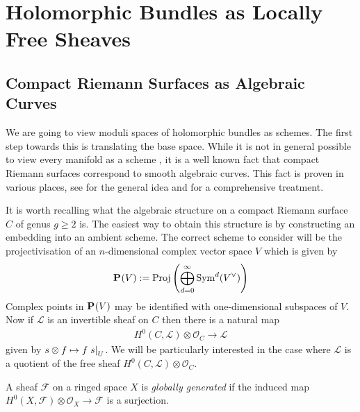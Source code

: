 \documentclass[12pt]{ociamthesis}  %
\begin{document}
\section{Holomorphic Bundles as Locally Free Sheaves}

\missingsection

\subsection{Compact Riemann Surfaces as Algebraic Curves}
\label{sec:surfaces_as_curves}

We are going to view moduli spaces of holomorphic bundles
as schemes. The first step towards this is translating the
base space. While it is not in general possible to view
every manifold as a scheme \missingcitation, it is a well
known fact that compact Riemann surfaces correspond to smooth
algebraic curves.
This fact is proven in various places, see \cite[215]{griffiths1994}
for the general idea and \cite[5-16]{harris2011}
for a comprehensive treatment.

It is worth recalling what the algebraic structure on a compact
Riemann surface $C$ of genus $g\geq 2$ is. The easiest way to obtain
this structure is by constructing an embedding into an ambient
scheme. The correct scheme to consider will be the projectivisation
of an $n$-dimensional complex vector space $V$ which is given
by
\begin{align*}
  \mathbf{P}^{}_{}(V) := \operatorname{Proj}\left({
      \bigoplus_{d=0}^\infty \operatorname{Sym}^d(V^\vee)
  }\right)
\end{align*}
Complex points in $\mathbf{P}^{}_{}(V)$ may be identified
with one-dimensional subspaces of $V$. \missingcitation
Now if $\mathcal L$ is
an invertible sheaf on $C$ then there is a natural map
\begin{align}\label{eq:natural_line_bundle_map}
  H^0(C,\mathcal L)\otimes\mathcal O_C \to \mathcal L
\end{align}
given by $s\otimes f \mapsto f\left.{s}\right\vert_{U}$. We will be
particularly interested in the case where $\mathcal L$ is a
quotient of the free sheaf $H^0(C,\mathcal L)\otimes\mathcal O_C$.

\begin{definition}
  A sheaf $\mathcal F$ on a ringed space $X$ is
  \emph{globally generated} if the induced map
  $H^0(X,\mathcal F) \otimes \mathcal O_X \to \mathcal F$
  is a surjection.
\end{definition}
\end{document}
